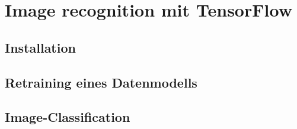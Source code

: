 \section{Image recognition mit TensorFlow}
\label{sec:Praxis}

\subsection{Installation}
\label{subsec:inst}

\subsection{Retraining eines Datenmodells}
\label{subsec:trans-erstellung}

\subsection{Image-Classification}
\label{subsec:trans-erstellung-mit-daten}
